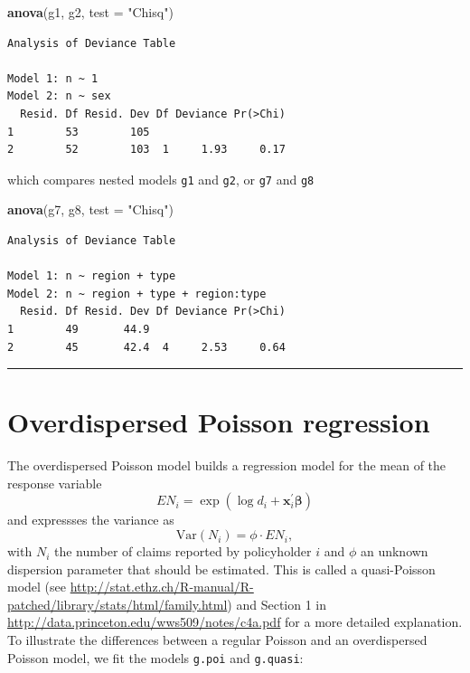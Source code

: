 \documentclass[
]{book}
\newenvironment{Shaded}{\begin{snugshade}}{\end{snugshade}}
\newcommand{\DataTypeTok}[1]{\textcolor[rgb]{0.13,0.29,0.53}{#1}}
\newcommand{\KeywordTok}[1]{\textcolor[rgb]{0.13,0.29,0.53}{\textbf{#1}}}
\newcommand{\NormalTok}[1]{#1}
\newcommand{\StringTok}[1]{\textcolor[rgb]{0.31,0.60,0.02}{#1}}
\begin{document}
\begin{Shaded}
\begin{Highlighting}[]
\KeywordTok{anova}\NormalTok{(g1, g2, }\DataTypeTok{test =} \StringTok{"Chisq"}\NormalTok{)}
\end{Highlighting}
\end{Shaded}

\begin{verbatim}
Analysis of Deviance Table

Model 1: n ~ 1
Model 2: n ~ sex
  Resid. Df Resid. Dev Df Deviance Pr(>Chi)
1        53        105                     
2        52        103  1     1.93     0.17
\end{verbatim}

which compares nested models \texttt{g1} and \texttt{g2}, or \texttt{g7} and \texttt{g8}

\begin{Shaded}
\begin{Highlighting}[]
\KeywordTok{anova}\NormalTok{(g7, g8, }\DataTypeTok{test =} \StringTok{"Chisq"}\NormalTok{)}
\end{Highlighting}
\end{Shaded}

\begin{verbatim}
Analysis of Deviance Table

Model 1: n ~ region + type
Model 2: n ~ region + type + region:type
  Resid. Df Resid. Dev Df Deviance Pr(>Chi)
1        49       44.9                     
2        45       42.4  4     2.53     0.64
\end{verbatim}

\begin{center}\rule{0.5\linewidth}{0.5pt}\end{center}

\hypertarget{overdispersed-poisson-regression}{%
\section{Overdispersed Poisson regression}\label{overdispersed-poisson-regression}}

The overdispersed Poisson model builds a regression model for the mean of the response variable
\[ EN_i = \exp{(\log d_i + \boldsymbol{x}_i^{'}\boldsymbol{\beta})} \]
and expressses the variance as
\[ \text{Var}(N_i) = \phi \cdot EN_i, \]
with \(N_i\) the number of claims reported by policyholder \(i\) and \(\phi\) an unknown dispersion parameter that should be estimated. This is called a quasi-Poisson model (see \url{http://stat.ethz.ch/R-manual/R-patched/library/stats/html/family.html}) and Section 1 in \url{http://data.princeton.edu/wws509/notes/c4a.pdf} for a more detailed explanation. To illustrate the differences between a regular Poisson and an overdispersed Poisson model, we fit the models \texttt{g.poi} and \texttt{g.quasi}:
\end{document}

